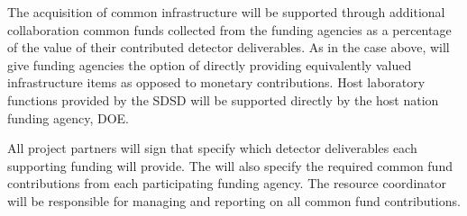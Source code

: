 The acquisition of common infrastructure will be supported through
additional collaboration common funds collected from the funding
agencies as a percentage of the value of their contributed detector
deliverables.  As in the case above,  will give funding agencies %
the option of directly providing equivalently valued infrastructure
items as opposed to %
monetary contributions.  Host laboratory
functions provided by the SDSD will be supported directly by the host nation
funding agency, DOE.

All project partners will sign  that specify which detector
deliverables each %
supporting funding %
will provide. The  will also specify the required common fund
contributions from each  participating funding agency.  The
 resource coordinator will be responsible for managing and
reporting on all common fund contributions.
